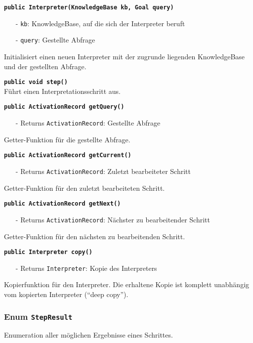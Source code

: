 \documentclass[parskip=full,11pt,twoside]{scrartcl}
\begin{document}
\textbf{\texttt{public Interpreter(KnowledgeBase kb, Goal query)}}
\begin{itemize}[noitemsep]
	\item[-] \texttt{kb}: KnowledgeBase, auf die sich der Interpreter beruft
	\item[-] \texttt{query}: Gestellte Abfrage
\end{itemize}
Initialisiert einen neuen Interpreter mit der zugrunde liegenden KnowledgeBase und der gestellten Abfrage.

\textbf{\texttt{public void step()}}\\
Führt einen Interpretationsschritt aus.

\textbf{\texttt{public ActivationRecord getQuery()}}
\begin{itemize}[noitemsep]
	\item[-] Returns \texttt{ActivationRecord}: Gestellte Abfrage
\end{itemize}
Getter-Funktion für die gestellte Abfrage.

\textbf{\texttt{public ActivationRecord getCurrent()}}
\begin{itemize}[noitemsep]
	\item[-] Returns \texttt{ActivationRecord}: Zuletzt bearbeiteter Schritt
\end{itemize}
Getter-Funktion für den zuletzt bearbeiteten Schritt.

\textbf{\texttt{public ActivationRecord getNext()}}
\begin{itemize}[noitemsep]
	\item[-] Returns \texttt{ActivationRecord}: Nächster zu bearbeitender Schritt
\end{itemize}
Getter-Funktion für den nächsten zu bearbeitenden Schritt.

\textbf{\texttt{public Interpreter copy()}}
\begin{itemize}[noitemsep]
	\item[-] Returns \texttt{Interpreter}: Kopie des Interpreters
\end{itemize}
Kopierfunktion für den Interpreter. Die erhaltene Kopie ist komplett unabhängig vom kopierten Interpreter (\enquote{deep copy}).

\subsubsection{Enum \texttt{StepResult}}
Enumeration aller möglichen Ergebnisse eines Schrittes.\\
\end{document}
